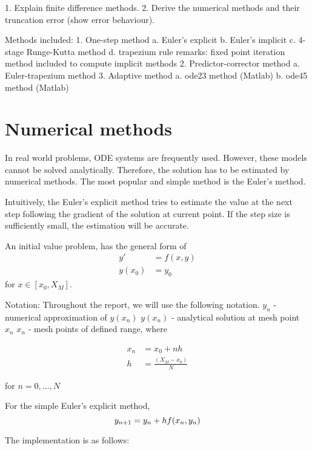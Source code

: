 1. Explain finite difference methods.
2. Derive the numerical methods and their truncation error (show error behaviour).

Methods included:
1. One-step method
    a. Euler's explicit
    b. Euler's implicit
    c. 4-stage Runge-Kutta method
    d. trapezium rule
    remarks: fixed point iteration method included to compute implicit methods
2. Predictor-corrector method
    a. Euler-trapezium method
3. Adaptive method
    a. ode23 method (Matlab)
    b. ode45 method (Matlab)
    
\chapter{Numerical methods}
\label{chap:numerical-methods}
In real world problems, ODE systems are frequently used. However, these models cannot be solved analytically. Therefore, the solution has to be estimated by numerical methods. The most popular and simple method is the Euler's method.

Intuitively, the Euler's explicit method tries to estimate the value at the next step following the gradient of the solution at current point. If the step size is sufficiently small, the estimation will be accurate.

An initial value problem, has the general form of 
\begin{align}
    y'&=f(x,y)\\
    y(x_0) &= y_0
\end{align}
for $x \in [x_0, X_M]$.

Notation:
Throughout the report, we will use the following notation.
$y_n$ - numerical approximation of $y(x_n)$
$y(x_n)$ - analytical solution at mesh point $x_n$
$x_n$ - mesh points of defined range, where

\begin{align}
    x_n &= x_0 + nh\\
    h &= \frac{(X_M - x_0)}{N}
\end{align}

for $n = 0,\dots, N$

For the simple Euler's explicit method, 
\begin{equation}
    y_{n+1} = y_n + hf(x_n,y_n)\\
\end{equation}

The implementation is as follows:

